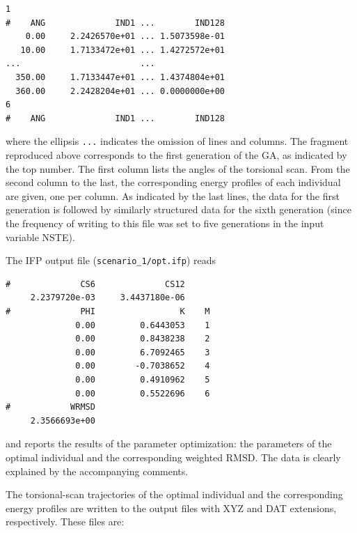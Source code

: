 \documentclass[10pt,a4paper,openany]{memoir}
\numberwithin{equation}{section}
\newcommand{\under}{\_}
\begin{document}
\begin{lstlisting}
1    
#    ANG              IND1 ...        IND128
    0.00     2.2426570e+01 ... 1.5073598e-01
   10.00     1.7133472e+01 ... 1.4272572e+01
...                        ...
  350.00     1.7133447e+01 ... 1.4374804e+01
  360.00     2.2428204e+01 ... 0.0000000e+00
6
#    ANG              IND1 ...        IND128  
\end{lstlisting}\vspace{1ex}\par

\noindent where the ellipsis \texttt{...} indicates the omission of lines and
columns.
%
The fragment reproduced above corresponds to the first generation of
the GA, as indicated by the top number.
%
The first column lists the angles of the torsional scan.
%
From the second column to the last, the corresponding energy profiles
of each individual are given, one per column.
%
As indicated by the last lines, the data for the first generation is
followed by similarly structured data for the sixth generation (since
the frequency of writing to this file was set to five generations in
the input variable NSTE).

The IFP output file (\texttt{scenario\under{}1/opt.ifp}) reads

\begin{lstlisting}
#              CS6              CS12
     2.2379720e-03     3.4437180e-06
#              PHI                 K    M
              0.00         0.6443053    1
              0.00         0.8438238    2
              0.00         6.7092465    3
              0.00        -0.7038652    4
              0.00         0.4910962    5
              0.00         0.5522696    6
#            WRMSD
     2.3566693e+00
\end{lstlisting}\vspace{1ex}\par

\noindent and reports the results of the parameter optimization: the
parameters of the optimal individual and the corresponding weighted
RMSD.
%
The data is clearly explained by the accompanying comments.


The torsional-scan trajectories of the optimal individual and the
corresponding energy profiles are written to the output files with XYZ
and DAT extensions, respectively.
%
These files are:
\end{document}
